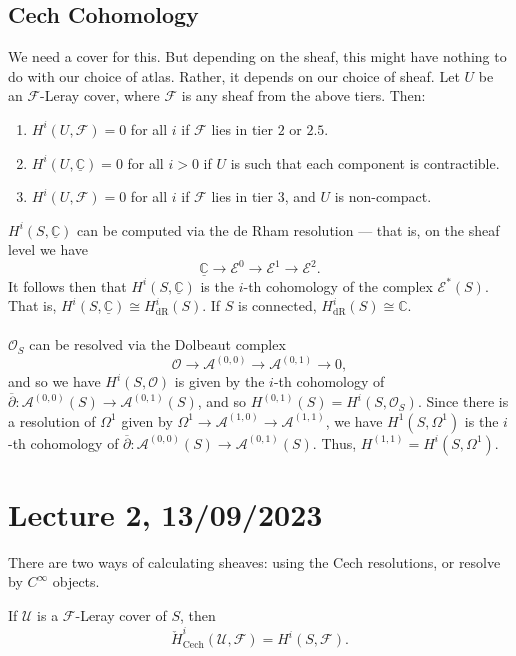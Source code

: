 \documentclass[a4paper]{report}
\theoremstyle{definition}
\theoremstyle{remark}
\theoremstyle{proposition}
\theoremstyle{conjecture}
\theoremstyle{lemma}
\theoremstyle{corollary}
\theoremstyle{exercise}
\theoremstyle{example}
\newcommand{\C}{\mathbb{C}}
\newcommand{\mcal}{\mathcal}
\newcommand{\on}{\operatorname}
\begin{document}
\subsection{Cech Cohomology}

We need a cover for this. But depending on the sheaf, this might have nothing
to do with our choice of atlas. Rather, it depends on our choice of sheaf.
Let $U$ be an $\mcal{F}$-Leray cover, where $\mcal{F}$ is any sheaf
from the above tiers. Then:
\begin{enumerate}
    \item $H^i(U,\mcal{F}) = 0$ for all $i$ if $\mcal{F}$ lies in tier $2$ or $2.5$.
    \item $H^i(U,\underline{\C}) = 0$ for all $i>0$ if $U$ is such that 
        each component is contractible.
    \item $H^i(U,\mcal{F}) = 0$ for all $i$ if $\mcal{F}$ lies in 
        tier $3$, and $U$ is non-compact.
\end{enumerate}

$H^i(S,\underline{\C})$ can be computed via the de Rham resolution --- 
that is, on the sheaf level we have 
$$\underline{\C} \longrightarrow \mcal{E}^0 \longrightarrow \mcal{E}^1 \longrightarrow \mcal{E}^2.$$
It follows then that $H^i(S,\underline{\C})$ is the $i$-th cohomology of the 
complex $\mcal{E}^\ast(S)$. That is, 
$H^i(S,\underline{\C})\cong H^i_{\on{dR}}(S)$.
If $S$ is connected, $H^i_{\on{dR}}(S) \cong \C$.\\\\
$\mcal{O}_S$ can be resolved via the Dolbeaut complex 
$$\mcal{O} \longrightarrow \mcal{A}^{(0,0)} \longrightarrow \mcal{A}^{(0,1)} \longrightarrow 0,$$
and so we have 
$H^i(S,\mcal{O})$ is given by the $i$-th cohomology of 
$\overline{\partial} : \mcal{A}^{(0,0)}(S) \to \mcal{A}^{(0,1)}(S)$, and so
$H^{(0,1)}(S) = H^i(S,\mcal{O}_S)$.
Since there is a resolution of $\Omega^1$ given by 
$\Omega^1 \to \mcal{A}^{(1,0)} \to \mcal{A}^{(1,1)}$, we 
have $H^1(S,\Omega^1)$ is the $i$-th cohomology of 
$\overline{\partial} : \mcal{A}^{(0,0)}(S) \to \mcal{A}^{(0,1)}(S)$. 
Thus, $H^{(1,1)} = H^i(S,\Omega^1)$.

\section{Lecture 2, 13/09/2023}

There are two ways of calculating sheaves: using the Cech resolutions, or 
resolve by $C^\infty$ objects.

\begin{theorem}
    If $\mcal{U}$ is a $\mcal{F}$-Leray cover of $S$, then 
    $$\check{H}^i_{\on{Cech}}(\mcal{U},\mcal{F}) = H^i(S,\mcal{F}).$$
\end{theorem}
\end{document}
